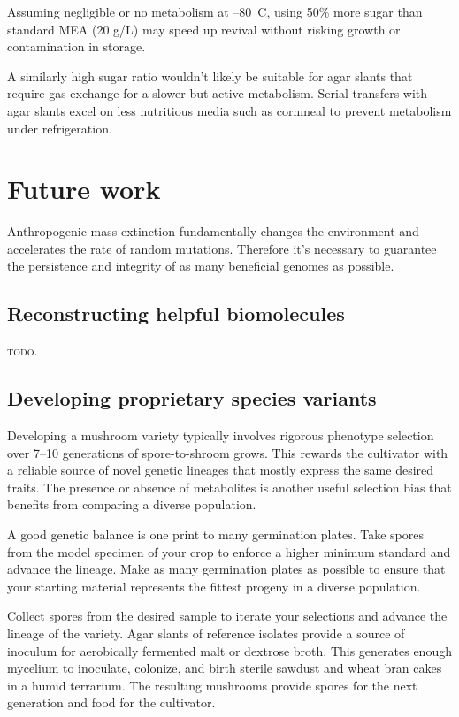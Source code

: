 \documentclass{article}
\begin{document}
Assuming negligible or no metabolism at --80~\textdegree C, using 50\% more sugar than standard MEA (20 g/L) may speed up revival without risking growth or contamination in storage.

A similarly high sugar ratio wouldn't likely be suitable for agar slants that require gas exchange for a slower but active metabolism.
Serial transfers with agar slants excel on less nutritious media such as cornmeal to prevent metabolism under refrigeration.~\cite{GGMM}


\section{Future work}

Anthropogenic mass extinction fundamentally changes the environment and accelerates the rate of random mutations.
Therefore it's necessary to guarantee the persistence and integrity of as many beneficial genomes as possible.


\subsection{Reconstructing helpful biomolecules}

\textsc{todo.}


\subsection{Developing proprietary species variants}

Developing a mushroom variety typically involves rigorous phenotype selection over 7--10 generations of spore-to-shroom grows.
This rewards the cultivator with a reliable source of novel genetic lineages that mostly express the same desired traits.
The presence or absence of metabolites is another useful selection bias that benefits from comparing a diverse population.

A good genetic balance is one print to many germination plates.
Take spores from the model specimen of your crop to enforce a higher minimum standard and advance the lineage.
Make as many germination plates as possible to ensure that your starting material represents the fittest progeny in a diverse population.

Collect spores from the desired sample to iterate your selections and advance the lineage of the variety.
Agar slants of reference isolates provide a source of inoculum for aerobically fermented malt or dextrose broth.
This generates enough mycelium to inoculate, colonize, and birth sterile sawdust and wheat bran cakes in a humid terrarium.
The resulting mushrooms provide spores for the next generation and food for the cultivator.





\end{document}

